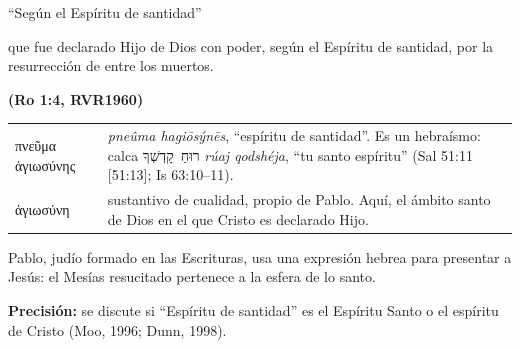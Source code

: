 \documentclass[hyperref={bookmarks=false},aspectratio=169]{beamer}
\newcommand{\heb}[1]{\mbox{\foreignlanguage{hebrew}{#1}}}
\newcommand{\grc}[1]{\foreignlanguage{ancientgreek}{#1}}
\newcommand{\fuente}[1]{\par\hfill{\upshape\bfseries\footnotesize\textcolor{azul}{#1}}}
\newcommand{\precision}[1]{{\footnotesize\color{gris}\textbf{Precisión:} #1}}
\begin{document}
\begin{frame}{``Según el Espíritu de santidad''}
\begin{cita}que fue declarado Hijo de Dios con poder, según el Espíritu de santidad, por la resurrección de entre los muertos.\fuente{(Ro 1:4, RVR1960)}\end{cita}
\scriptsize\renewcommand{\arraystretch}{1.22}
\begin{tabular}{@{}>{\RaggedRight\arraybackslash}p{3.0cm}>{\RaggedRight\arraybackslash}p{8.8cm}@{}}
\toprule
\grc{πνεῦμα ἁγιωσύνης} & \emph{pneûma hagiōsýnēs}, ``espíritu de santidad''. Es un hebraísmo: calca \heb{רוּחַ קָדְשְׁךָ} \emph{rúaj qodshéja}, ``tu santo espíritu'' (Sal 51:11 [51:13]; Is 63:10--11). \\
\grc{ἁγιωσύνη} & sustantivo de cualidad, propio de Pablo. Aquí, el ámbito santo de Dios en el que Cristo es declarado Hijo. \\
\bottomrule
\end{tabular}\par\medskip
\small Pablo, judío formado en las Escrituras, usa una expresión hebrea para presentar a Jesús: el Mesías resucitado pertenece a la esfera de lo santo.\par\smallskip
\precision{se discute si ``Espíritu de santidad'' es el Espíritu Santo o el espíritu de Cristo (Moo, 1996; Dunn, 1998).}
\end{frame}
\end{document}
